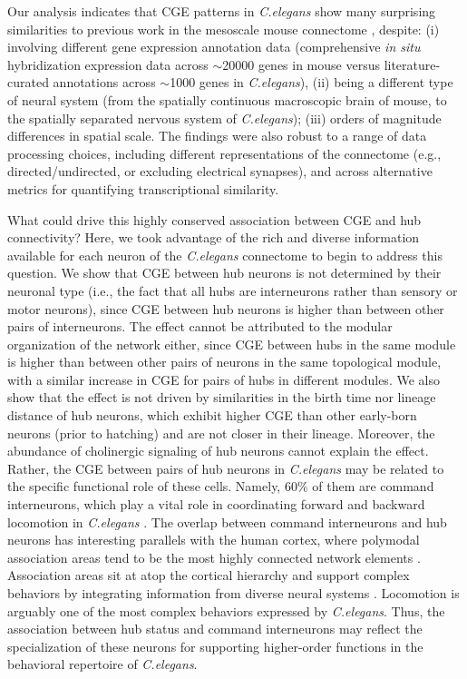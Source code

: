{Our analysis indicates that CGE patterns in \emph{C.elegans} show many surprising similarities to previous work in the mesoscale mouse connectome \citep{Fulcher2016}, despite:
(i) involving different gene expression annotation data (comprehensive \emph{in situ} hybridization expression data across $\sim$\num{20000} genes in mouse versus literature-curated annotations across $\sim$\num{1000} genes in \emph{C.elegans}),
(ii) being a different type of neural system (from the spatially continuous macroscopic brain of mouse, to the spatially separated nervous system of \emph{C.elegans});
(iii) orders of magnitude differences in spatial scale.
The findings were also robust to a range of data processing choices, including different representations of the connectome (e.g., directed/undirected, or excluding electrical synapses), and across alternative metrics for quantifying transcriptional similarity.

What could drive this highly conserved association between CGE and hub connectivity?
Here, we took advantage of the rich and diverse information available for each neuron of the \emph{C.elegans} connectome to begin to address this question.
We show that CGE between hub neurons is not determined by their neuronal type (i.e., the fact that all hubs are interneurons rather than sensory or motor neurons), since CGE between hub neurons is higher than between other pairs of interneurons.
The effect cannot be attributed to the modular organization of the network either, since CGE between hubs in the same module is higher than between other pairs of neurons in the same topological module, with a similar increase in CGE for pairs of hubs in different modules.
We also show that the effect is not driven by similarities in the birth time nor lineage distance of hub neurons, which exhibit higher CGE than other early-born neurons (prior to hatching) and are not closer in their lineage.
Moreover, the abundance of cholinergic signaling of hub neurons cannot explain the effect.
Rather, the CGE between pairs of hub neurons in \textit{C.elegans} may be related to the specific functional role of these cells.
Namely, 60\% of them are command interneurons, which play a vital role in coordinating forward and backward locomotion in \textit{C.elegans} \citep{Kim2016}.
The overlap between command interneurons and hub neurons has interesting parallels with the human cortex, where polymodal association areas tend to be the most highly connected network elements \citep{VandenHeuvel2016}.
Association areas sit at atop the cortical hierarchy and support complex behaviors by integrating information from diverse neural systems \citep{Mesulam1998}.
Locomotion is arguably one of the most complex behaviors expressed by \emph{C.elegans}.
Thus, the association between hub status and command interneurons may reflect the specialization of these neurons for supporting higher-order functions in the behavioral repertoire of \emph{C.elegans}.

}

